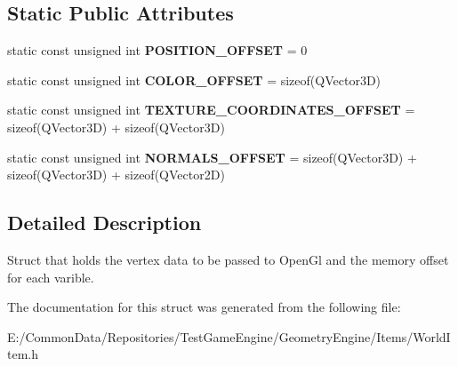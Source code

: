 \subsection*{Static Public Attributes}
\begin{DoxyCompactItemize}
\item 
\mbox{\label{struct_geometry_engine_1_1_vertex_data_ad3b4e1276bf54a0079daac5d269d0dc0}} 
static const unsigned int {\bfseries P\+O\+S\+I\+T\+I\+O\+N\+\_\+\+O\+F\+F\+S\+ET} = 0
\item 
\mbox{\label{struct_geometry_engine_1_1_vertex_data_a1de97b7fd1099d5d61b655262cb317d5}} 
static const unsigned int {\bfseries C\+O\+L\+O\+R\+\_\+\+O\+F\+F\+S\+ET} = sizeof(Q\+Vector3D)
\item 
\mbox{\label{struct_geometry_engine_1_1_vertex_data_a83b0e44fe7fc29c6ca38b0e734bba5ed}} 
static const unsigned int {\bfseries T\+E\+X\+T\+U\+R\+E\+\_\+\+C\+O\+O\+R\+D\+I\+N\+A\+T\+E\+S\+\_\+\+O\+F\+F\+S\+ET} = sizeof(Q\+Vector3D) + sizeof(Q\+Vector3D)
\item 
\mbox{\label{struct_geometry_engine_1_1_vertex_data_abf1cdc4fd3dc177c1323d861784b9723}} 
static const unsigned int {\bfseries N\+O\+R\+M\+A\+L\+S\+\_\+\+O\+F\+F\+S\+ET} = sizeof(Q\+Vector3D) + sizeof(Q\+Vector3D) + sizeof(Q\+Vector2D)
\end{DoxyCompactItemize}


\subsection{Detailed Description}
Struct that holds the vertex data to be passed to Open\+Gl and the memory offset for each varible. 

The documentation for this struct was generated from the following file\+:\begin{DoxyCompactItemize}
\item 
E\+:/\+Common\+Data/\+Repositories/\+Test\+Game\+Engine/\+Geometry\+Engine/\+Items/World\+Item.\+h\end{DoxyCompactItemize}
